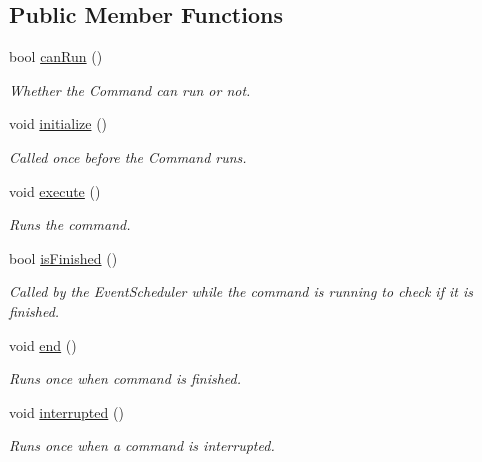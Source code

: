 \subsection*{Public Member Functions}
\begin{DoxyCompactItemize}
\item 
bool \mbox{\hyperlink{class_example_command_ad1df0170d99bcef6c6bc1676551f9539}{can\+Run}} ()
\begin{DoxyCompactList}\small\item\em Whether the Command can run or not. \end{DoxyCompactList}\item 
void \mbox{\hyperlink{class_example_command_ae7bea17127c1697acbf90d6022eb5b5d}{initialize}} ()
\begin{DoxyCompactList}\small\item\em Called once before the Command runs. \end{DoxyCompactList}\item 
\mbox{\label{class_example_command_af6fead537dd568d80aa3097ca207eda5}} 
void \mbox{\hyperlink{class_example_command_af6fead537dd568d80aa3097ca207eda5}{execute}} ()
\begin{DoxyCompactList}\small\item\em Runs the command. \end{DoxyCompactList}\item 
bool \mbox{\hyperlink{class_example_command_ab4e52d526bda7fe22705b2d3c44286e0}{is\+Finished}} ()
\begin{DoxyCompactList}\small\item\em Called by the Event\+Scheduler while the command is running to check if it is finished. \end{DoxyCompactList}\item 
\mbox{\label{class_example_command_ac3da078fdf1e7a7f94488db815bb0457}} 
void \mbox{\hyperlink{class_example_command_ac3da078fdf1e7a7f94488db815bb0457}{end}} ()
\begin{DoxyCompactList}\small\item\em Runs once when command is finished. \end{DoxyCompactList}\item 
\mbox{\label{class_example_command_ae5a4bb67aa6e6c6234c3dca8eb7ad7ec}} 
void \mbox{\hyperlink{class_example_command_ae5a4bb67aa6e6c6234c3dca8eb7ad7ec}{interrupted}} ()
\begin{DoxyCompactList}\small\item\em Runs once when a command is interrupted. \end{DoxyCompactList}\end{DoxyCompactItemize}
